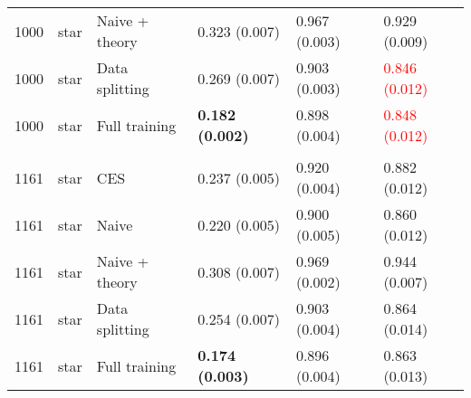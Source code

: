 \begin{tabular}[t]{rlllll}
\hspace{1em}1000 & star & Naive + theory & 0.323 (0.007) & 0.967 (0.003) & 0.929 (0.009)\\
\hspace{1em}1000 & star & Data splitting & 0.269 (0.007) & 0.903 (0.003) & \textcolor{red}{0.846 (0.012)}\\
\hspace{1em}1000 & star & Full training & \textbf{0.182 (0.002)} & 0.898 (0.004) & \textcolor{red}{0.848 (0.012)}\\
\addlinespace[0.3em]
\multicolumn{6}{l}{\textbf{1161}}\\
\hspace{1em}1161 & star & CES & 0.237 (0.005) & 0.920 (0.004) & 0.882 (0.012)\\
\hspace{1em}1161 & star & Naive & 0.220 (0.005) & 0.900 (0.005) & 0.860 (0.012)\\
\hspace{1em}1161 & star & Naive + theory & 0.308 (0.007) & 0.969 (0.002) & 0.944 (0.007)\\
\hspace{1em}1161 & star & Data splitting & 0.254 (0.007) & 0.903 (0.004) & 0.864 (0.014)\\
\hspace{1em}1161 & star & Full training & \textbf{0.174 (0.003)} & 0.896 (0.004) & 0.863 (0.013)\\
\bottomrule
\end{tabular}


